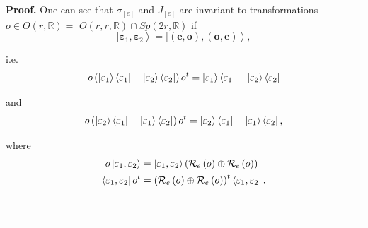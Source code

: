 \documentclass[aps,preprint]{revtex4}
\newenvironment{proof}[1][Proof]{\noindent\textbf{#1.} }{\ \rule{0.5em}{0.5em}}
\begin{document}
\begin{proof}
One can see that $\sigma_{\left[ e\right] }$ and $J_{\left[ e\right] }$ are
invariant to transformations $o\in O\left( r,\mathbb{R}\right) =$ $O\left(
r,r,\mathbb{R}\right) \cap Sp\left( 2r,\mathbb{R}\right) $ if 
\begin{equation}
\left\vert \mathbf{\varepsilon}_{1},\mathbf{\varepsilon}_{2}\right\rangle
=\left\vert \left( \mathbf{e},\mathbf{o}\right) ,\left( \mathbf{o},\mathbf{e}%
\right) \right\rangle ,
\end{equation}

i.e. 
\begin{equation}
o\left( \left\vert \mathbf{\varepsilon}_{1}\right\rangle \left\langle 
\mathbf{\varepsilon}_{1}\right\vert -\left\vert \mathbf{\varepsilon}%
_{2}\right\rangle \left\langle \mathbf{\varepsilon}_{2}\right\vert \right)
o^{t}=\left\vert \mathbf{\varepsilon}_{1}\right\rangle \left\langle \mathbf{%
\varepsilon}_{1}\right\vert -\left\vert \mathbf{\varepsilon}%
_{2}\right\rangle \left\langle \mathbf{\varepsilon}_{2}\right\vert
\end{equation}

and%
\begin{equation}
o\left( \left\vert \mathbf{\varepsilon}_{2}\right\rangle \left\langle 
\mathbf{\varepsilon}_{1}\right\vert -\left\vert \mathbf{\varepsilon}%
_{1}\right\rangle \left\langle \mathbf{\varepsilon}_{2}\right\vert \right)
o^{t}=\left\vert \mathbf{\varepsilon}_{2}\right\rangle \left\langle \mathbf{%
\varepsilon}_{1}\right\vert -\left\vert \mathbf{\varepsilon}%
_{1}\right\rangle \left\langle \mathbf{\varepsilon}_{2}\right\vert ,
\end{equation}

where 
\begin{align}
o\left\vert \mathbf{\varepsilon}_{1},\mathbf{\varepsilon}_{2}\right\rangle &
=\left\vert \mathbf{\varepsilon}_{1},\mathbf{\varepsilon}_{2}\right\rangle
\left( \mathcal{R}_{e}\left( o\right) \oplus\mathcal{R}_{e}\left( o\right)
\right) \\
\left\langle \mathbf{\varepsilon}_{1},\mathbf{\varepsilon}_{2}\right\vert
o^{t} & =\left( \mathcal{R}_{e}\left( o\right) \oplus\mathcal{R}_{e}\left(
o\right) \right) ^{t}\left\langle \mathbf{\varepsilon}_{1},\mathbf{%
\varepsilon}_{2}\right\vert .
\end{align}


\end{proof}
\end{document}
